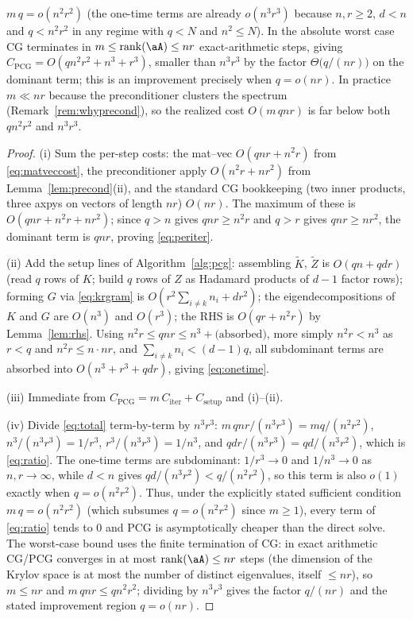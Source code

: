\begin{lemma}
\begin{enumerate}[label=\textup{(\roman*)}]
      $m\,q=o(n^{2}r^{2})$ (the one-time terms are already
      $o(n^{3}r^{3})$ because $n,r\ge2$, $d<n$ and $q<n^{2}r^{2}$ in any regime
      with $q<N$ and $n^2\le N$). In the absolute worst case CG terminates in
      $m\le\operatorname{rank}(\aA)\le nr$ exact-arithmetic steps, giving
      $C_{\mathrm{PCG}}=O(qn^{2}r^{2}+n^{3}+r^{3})$, smaller than $n^{3}r^{3}$
      by the factor $\Theta\!\big(q/(nr)\big)$ on the dominant term; this is an
      improvement precisely when $q=o(nr)$. In practice $m\ll nr$ because the
      preconditioner clusters the spectrum (Remark~\ref{rem:whyprecond}), so
      the realized cost $O(m\,qnr)$ is far below both $qn^2r^2$ and $n^3r^3$.
\end{enumerate}
\end{lemma}

\begin{proof}
(i) Sum the per-step costs: the mat--vec $O(qnr+n^{2}r)$ from
\eqref{eq:matveccost}, the preconditioner apply $O(n^{2}r+nr^{2})$ from
Lemma~\ref{lem:precond}(ii), and the standard CG bookkeeping (two inner
products, three axpys on vectors of length $nr$) $O(nr)$. The maximum of these
is $O(qnr+n^{2}r+nr^{2})$; since $q>n$ gives $qnr\ge n^{2}r$ and $q>r$ gives
$qnr\ge nr^{2}$, the dominant term is $qnr$, proving \eqref{eq:periter}.

(ii) Add the setup lines of Algorithm~\ref{alg:pcg}: assembling $\tilde K$,
$\tilde Z$ is $O(qn+qdr)$ (read $q$ rows of $K$; build $q$ rows of $Z$ as
Hadamard products of $d-1$ factor rows); forming $G$ via \eqref{eq:krgram} is
$O(r^{2}\sum_{i\neq k}n_i+dr^{2})$; the eigendecompositions of $K$ and $G$ are
$O(n^{3})$ and $O(r^{3})$; the RHS is $O(qr+n^{2}r)$ by Lemma~\ref{lem:rhs}.
Using $n^{2}r\le qnr\le n^3+ \text{(absorbed)}$, more simply $n^2r<n^3$ as $r<q$
and $n^2 r\le n\cdot nr$, and $\sum_{i\neq k}n_i<(d-1)q$, all subdominant terms
are absorbed into $O(n^{3}+r^{3}+qdr)$, giving \eqref{eq:onetime}.

(iii) Immediate from $C_{\mathrm{PCG}}=m\,C_{\mathrm{iter}}+C_{\mathrm{setup}}$
and (i)--(ii).

(iv) Divide \eqref{eq:total} term-by-term by $n^{3}r^{3}$:
$m\,qnr/(n^{3}r^{3})=mq/(n^{2}r^{2})$, $n^{3}/(n^{3}r^{3})=1/r^{3}$,
$r^{3}/(n^{3}r^{3})=1/n^{3}$, and $qdr/(n^{3}r^{3})=qd/(n^{3}r^{2})$, which is
\eqref{eq:ratio}. The one-time terms are subdominant: $1/r^{3}\to0$ and
$1/n^{3}\to0$ as $n,r\to\infty$, while $d<n$ gives
$qd/(n^{3}r^{2})<q/(n^{2}r^{2})$, so this term is also $o(1)$ exactly when
$q=o(n^{2}r^{2})$. Thus, under the explicitly stated sufficient condition
$m\,q=o(n^{2}r^{2})$ (which subsumes $q=o(n^{2}r^{2})$ since $m\ge1$), every
term of \eqref{eq:ratio} tends to $0$ and PCG is asymptotically cheaper than the
direct solve. The worst-case bound uses the finite
termination of CG: in exact arithmetic CG/PCG converges in at most
$\operatorname{rank}(\aA)\le nr$ steps (the dimension of the Krylov space is at
most the number of distinct eigenvalues, itself $\le nr$), so $m\le nr$ and
$m\,qnr\le qn^{2}r^{2}$; dividing by $n^{3}r^{3}$ gives the factor $q/(nr)$ and
the stated improvement region $q=o(nr)$.
\end{proof}

